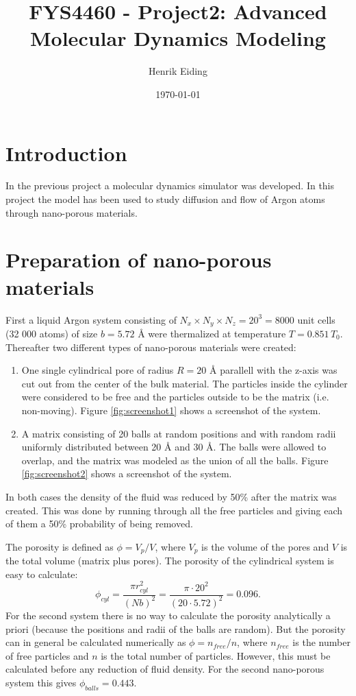 \documentclass[12pt]{article}
\newcommand{\bdi}{\begin{displaymath}}
\newcommand{\edi}{\end{displaymath}}
\begin{document}
\title{FYS4460 - Project2: Advanced Molecular Dynamics Modeling}
\author{Henrik Eiding}
\date{\today}
\maketitle
\thispagestyle{empty}
\newpage

\section{Introduction}

In the previous project a molecular dynamics simulator was developed. In this project the model has been used to study diffusion and flow of Argon atoms through
nano-porous materials.

\section{Preparation of nano-porous materials}
First a liquid Argon system consisting of $N_x \times N_y \times N_z = 20^3 = 8000$ unit cells (32 000 atoms) of size $b = 5.72$ Å were thermalized at temperature $T = 0.851\,T_0$. Thereafter two different types of
nano-porous materials were created:
\begin{enumerate}
 \item One single cylindrical pore of radius $R = 20$ Å parallell with the z-axis was cut out from the center of the bulk material. The particles inside the cylinder were
       considered to be free and the particles outside to be the matrix (i.e. non-moving). Figure \ref{fig:screenshot1} shows a screenshot of the system.
 \item A matrix consisting of 20 balls at random positions and with random radii uniformly distributed between 20 Å and 30 Å. The balls were allowed to overlap, and the matrix was modeled as the union of all
       the balls. Figure \ref{fig:screenshot2} shows a screenshot of the system.
\end{enumerate}

In both cases the density of the fluid was reduced by 50\% after the matrix was created. This was done by running through all the free particles and giving each of them a 50\% probability of being removed.

The porosity is defined as $\phi = V_p/V$, where $V_p$ is the volume of the pores and $V$ is the total volume (matrix plus pores). The porosity of the cylindrical system is easy to calculate:
\bdi
\phi_{cyl} = \frac{\pi r_{cyl}^2}{(Nb)^2} = \frac{\pi\cdot20^2}{(20\cdot5.72)^2} = 0.096.
\edi
For the second system there is no way to calculate the porosity analytically a priori (because the positions and radii of the balls are random). But the porosity can in general be calculated numerically as
$\phi = n_{free}/n$, where $n_{free}$ is the number of free particles and $n$ is the total number of particles. However, this must be calculated before any reduction of fluid density.
 For the second nano-porous system this gives $\phi_{balls} = 0.443$.
\end{document}
